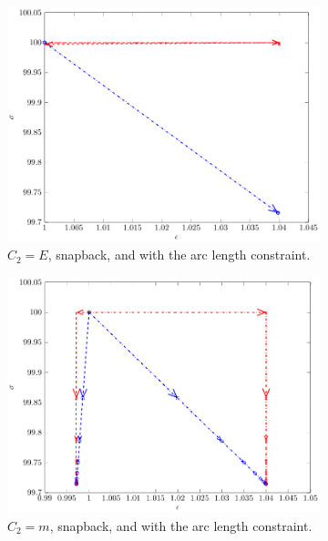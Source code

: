 \documentclass[11pt]{elsarticle}
\begin{document}
\begin{figure}\ContinuedFloat
	\begin{subfigure}{0.45\textwidth}
		\centering
		\includegraphics[scale=0.7]{./conv_figs/bad_metric_snap_arc_length.pdf}
		\caption{$C_2=E$, snapback, and with the arc length constraint.}
		\label{bad_metric_snap_arc_length}
	\end{subfigure}
	\hfill
	\begin{subfigure}{0.45\textwidth}
		\centering
		\includegraphics[scale=0.7]{./conv_figs/good_metric_snap_arc_length.pdf}
		\caption{$C_2=m$, snapback, and with the arc length constraint.}
		\label{good_metric_snap_arc_length}
	\end{subfigure}
	\begin{subfigure}{0.45\textwidth}

\end{subfigure}
\end{figure}
\end{document}
